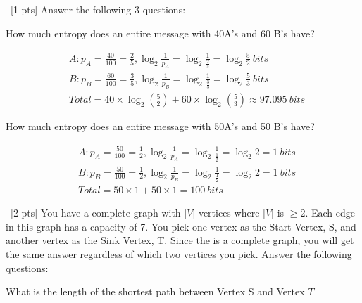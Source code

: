 \documentclass[12pt]{article}
\newenvironment{sol}[1][Solution]{\begin{trivlist}\item[\hskip\labelsep {\bfseries #1:}]}{\end{trivlist}}
\begin{document}
\begin{enumerate}
\begin{sol}
    \end{sol}
    
    \item \ [1 pts] Answer the following 3 questions:
    \begin{enumerate}
        \item How much entropy does an entire message with 40A's and 60 B's have?
        \begin{sol}
        \begin{align*}
            &A: p_A = \frac{40}{100} = \frac{2}{5}, \log_2{\frac{1}{p_A}} = \log_2{\frac{1}{\frac{2}{5}}} = \log_2{\frac{5}{2}} \ bits \\
            &B: p_B = \frac{60}{100} = \frac{3}{5}, \log_2{\frac{1}{p_B}} = \log_2{\frac{1}{\frac{3}{5}}} = \log_2{\frac{5}{3}} \ bits \\
            &Total = 40 \times \log_2(\frac{5}{2}) + 60 \times \log_2(\frac{5}{3}) \approx 97.095\  bits
        \end{align*}
        \end{sol}
        \item How much entropy does an entire message with 50A's and 50 B's have?
        \begin{sol}
        \begin{align*}
            &A: p_A = \frac{50}{100} = \frac{1}{2}, \log_2{\frac{1}{p_A}} = \log_2{\frac{1}{\frac{1}{2}}} = \log_2{2}=1 \ bits \\
            &B: p_B = \frac{50}{100} = \frac{1}{2}, \log_2{\frac{1}{p_B}} = \log_2{\frac{1}{\frac{1}{2}}} = \log_2{2}=1 \ bits \\
            &Total = 50 \times 1 + 50 \times 1 = 100 \ bits
        \end{align*}
        \end{sol}
    \end{enumerate}
    \item \ [2 pts] You have a complete graph with $|V|$ vertices where $|V|$ is $ \geq 2$. Each edge in this graph has a capacity of 7. You pick one vertex as the Start Vertex, S, and another vertex as the Sink Vertex, T. Since the is a complete graph, you will get the same answer regardless of which two vertices you pick. Answer the following questions:
    \begin{enumerate}
        \item What is the length of the shortest path between Vertex S and Vertex $T$
        \begin{sol}
        \hspace*{\fill}\\

\end{sol}
\end{enumerate}
\end{enumerate}
\end{document}
